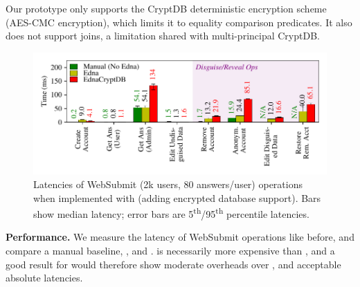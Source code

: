 
%
%
Our prototype only supports the CryptDB deterministic encryption scheme
(AES-CMC encryption), which limits it to equality comparison predicates. It also does not
support joins, a limitation shared with multi-principal CryptDB.
%
%
%

\begin{figure}[t]
  \centering
      \includegraphics[width=\columnwidth]{figs/websubmit_cryptdb_op_stats}
    \caption{Latencies of WebSubmit (2k users, 80 answers/user) operations when
    implemented with \syscrypt (adding encrypted database support).
    Bars show median latency; error bars are
    5\textsuperscript{th}/95\textsuperscript{th} percentile latencies.}
  \label{f:cryptdb_ws_opstats}
\end{figure}

%
\textbf{Performance.}
We measure the latency of WebSubmit operations like before, and compare a manual
baseline, \sys, and \syscrypt.
%
\syscrypt is necessarily more expensive than \sys, and a good result for
\syscrypt would therefore show moderate overheads over \sys, and acceptable
absolute latencies.
%


